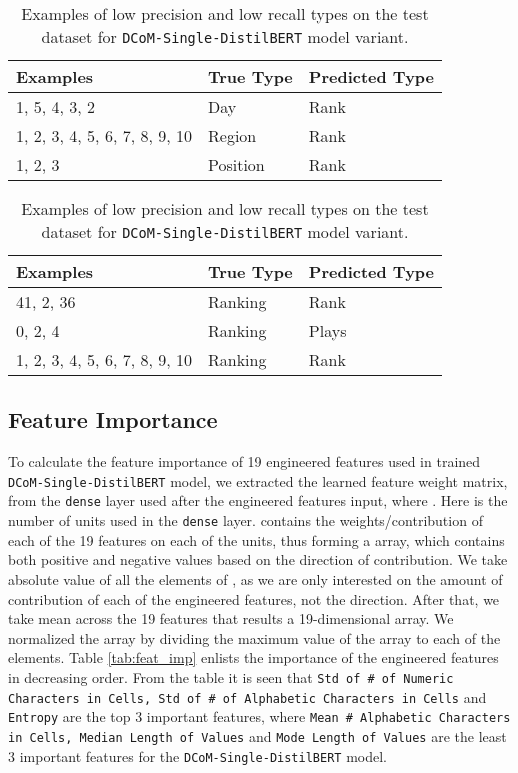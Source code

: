 \documentclass{article}
\begin{document}
\begin{table}
	\centering
	\begin{adjustbox}{center}
		\begin{tabular}{lll}
			\hline
			\textbf{Examples} & \textbf{True Type} & \textbf{Predicted Type}\\
			\hline
			1, 5, 4, 3, 2 & Day & Rank\\
			1, 2, 3, 4, 5, 6, 7, 8, 9, 10  & Region & Rank \\
			1, 2, 3 & Position & Rank \\
			\hline
		\end{tabular} 
	\end{adjustbox}
	\caption*{(a) Low Precision}
	
	
	\begin{adjustbox}{center}
		\begin{tabular}{lll}
			\hline
			\textbf{Examples} & \textbf{True Type} & \textbf{Predicted Type}\\
			\hline
			41, 2, 36 & Ranking & Rank\\
			0, 2, 4  & Ranking & Plays \\
			1, 2, 3, 4, 5, 6, 7, 8, 9, 10 & Ranking & Rank \\
			\hline
		\end{tabular}
	\end{adjustbox}
	\caption*{(a) Low Recall}
	\caption{Examples of low precision and low recall types on the test dataset for \texttt{DCoM-Single-DistilBERT} model variant.}
	\label{tab:low_recall_precision}
\end{table}

\subsection{Feature Importance}
To calculate the feature importance of 19 engineered features used in trained \texttt{DCoM-Single-DistilBERT} model, we extracted the learned feature weight matrix,  from the \texttt{dense} layer used after the engineered features input, where . Here  is the number of units used in the \texttt{dense} layer.  contains the weights/contribution of each of the 19 features on each of the  units, thus forming a  array, which contains both positive and negative values based on the direction of contribution. We take absolute value of all the elements of , as we are only interested on the amount of contribution of each of the engineered features, not the direction. After that, we take mean across the 19 features that results a 19-dimensional array. We normalized the array by dividing the maximum value of the array to each of the elements. Table \ref{tab:feat_imp} enlists the importance of the engineered features in decreasing order. From the table it is seen that \texttt{Std of \# of   Numeric Characters in Cells, Std of \# of   Alphabetic Characters in Cells} and \texttt{Entropy} are the top 3 important features, where \texttt{Mean \# Alphabetic   Characters in Cells, Median Length of   Values} and \texttt{Mode Length of   Values} are the least 3 important features for the \texttt{DCoM-Single-DistilBERT} model.
\end{document}
